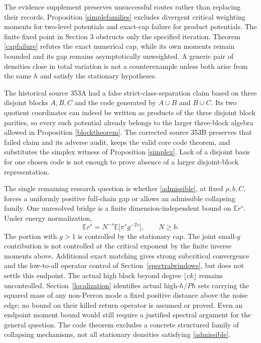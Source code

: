 \documentclass[11pt]{article}
\newcommand{\E}{\mathbb E}
\begin{document}
The evidence supplement preserves unsuccessful routes rather than replacing their records. Proposition \ref{simplefamilies} excludes divergent critical weighting moments for two-level potentials and exact-cap failure for product potentials. The finite fixed point in Section 3 obstructs only the specified iteration. Theorem \ref{capfailure} refutes the exact numerical cap, while its own moments remain bounded and its gap remains asymptotically unweighted. A generic pair of densities close in total variation is not a counterexample unless both arise from the same $h$ and satisfy the stationary hypotheses.

The historical source 353A had a false strict-class-separation claim based on three disjoint blocks $A,B,C$ and the code generated by $A\cup B$ and $B\cup C$. Its two quotient coordinates can indeed be written as products of the three disjoint block parities, so every such potential already belongs to the larger three-block algebra allowed in Proposition \ref{blocktheorem}. The corrected source 353B preserves that failed claim and its adverse audit, keeps the valid core code theorem, and substitutes the simplex witness of Proposition \ref{simplex}. Lack of a disjoint basis for one chosen code is not enough to prove absence of a larger disjoint-block representation.

The single remaining research question is whether \eqref{admissible}, at fixed $\rho,b,C$, forces a uniformly positive full-chain gap or allows an admissible collapsing family. One unresolved bridge is a finite dimension-independent bound on $\E r^s$. Under energy normalization,
\[
 \E r^s=N^{-s}\E\bigl[\pi^s g^{-2s}\bigr],\qquad N\geq b.
\]
The portion with $g>1$ is controlled by the stationary cap. The joint small-$g$ contribution is not controlled at the critical exponent by the finite inverse moments above. Additional exact matching gives strong subcritical convergence and the low-to-all operator control of Section~\ref{spectralwindows}, but does not settle this endpoint. The actual high block beyond degree $\lfloor ck\rfloor$ remains uncontrolled. Section~\ref{localization} identifies actual high-$h/Ph$ sets carrying the squared mass of any non-Perron mode a fixed positive distance above the noise edge; no bound on their killed return operator is assumed or proved. Even an endpoint moment bound would still require a justified spectral argument for the general question. The code theorem excludes a concrete structured family of collapsing mechanisms, not all stationary densities satisfying \eqref{admissible}.
\end{document}
